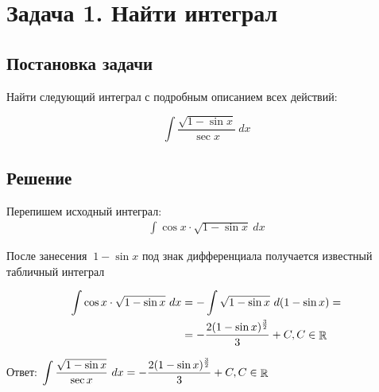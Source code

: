 \def \task {
	\int \frac{\sqrt{1 - \sin{x}}}{ \sec{x} } ~ dx
}

\section{Задача 1. Найти интеграл}
\subsection{Постановка задачи}
Найти следующий интеграл с подробным описанием всех действий:

\[\task \]

\subsection{Решение}

Перепишем исходный интеграл:
\begin{align*}
	\int \cos{x} \cdot \sqrt{1 - \sin{x}} ~ dx
\end{align*}

После занесения $\ 1 - \sin{x} $ под знак дифференциала получается известный табличный интеграл

\begin{align*}
	\int  \cos{x} \cdot \sqrt{1 - \sin{x}} ~ dx
	& = -\int \sqrt{1 - \sin{x}} ~ d(1 - \sin{x}) = \\
	& = -\frac{2 (1 - \sin{x})^\frac{3}{2}}{3} + {C},
	C \in \mathop{\rm \mathbb{R}}
\end{align*}

Ответ: $ \displaystyle \task = -\frac{2 (1 - \sin{x})^\frac{3}{2}}{3} + {C}, C \in \rational $
